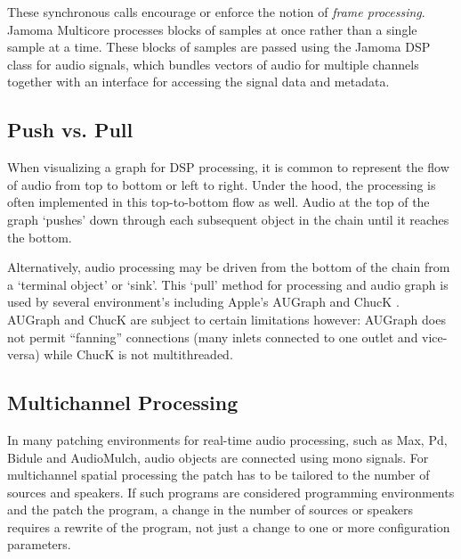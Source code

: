 \documentclass[twoside,a4paper]{article}
\begin{document}

These synchronous calls encourage or enforce the notion of \emph{frame processing}.  Jamoma Multicore processes blocks of samples at once rather than a single sample at a time.  These blocks of samples are passed using the Jamoma DSP class for audio signals, which bundles vectors of audio for multiple channels together with an interface for accessing the signal data and metadata.




\subsection{Push vs. Pull} %

When visualizing a graph for DSP processing, it is common to represent the flow of audio from top to bottom or left to right.  Under the hood, the processing is often implemented in this top-to-bottom flow as well.  Audio at the top of the graph `pushes' down through each subsequent object in the chain until it reaches the bottom.

Alternatively, audio processing may be driven from the bottom of the chain from a `terminal object' or `sink'.  This `pull' method for processing and audio graph is used by several environment's including Apple's AUGraph and ChucK \cite{wang:2008}.  AUGraph and ChucK are subject to certain limitations however: AUGraph does not permit ``fanning'' connections (many inlets connected to one outlet and vice-versa) while ChucK is not multithreaded.




\subsection{Multichannel Processing} %

In many patching environments for real-time audio processing, such as Max, Pd, Bidule and AudioMulch, audio objects are connected using mono signals. For multichannel spatial processing the patch has to be tailored to the number of sources and speakers. If such programs are considered programming environments and the patch the program, a change in the number of sources or speakers requires a rewrite of the program, not just a change to one or more configuration parameters.
\end{document}
